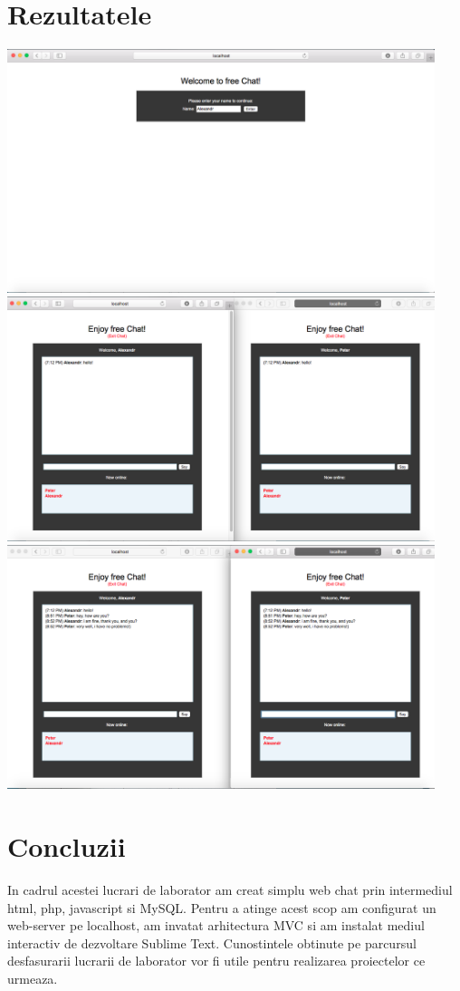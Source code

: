 \documentclass[12pt]{article}
\begin{document}
\section {Rezultatele}
\includegraphics[width=12.5cm]{images/6}\\
\includegraphics[width=12.5cm]{images/7}\\
\includegraphics[width=12.5cm]{images/8}
\section*{Concluzii}
In cadrul acestei lucrari de laborator am creat simplu web chat  prin intermediul html, php, javascript si MySQL. Pentru a atinge acest scop am configurat un web-server pe localhost, am invatat arhitectura MVC si am instalat mediul interactiv de dezvoltare Sublime Text.  Cunostintele obtinute pe parcursul desfasurarii lucrarii de laborator vor fi utile pentru realizarea proiectelor ce urmeaza.
\newpage
\end{document}
